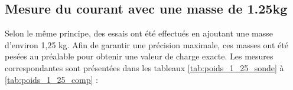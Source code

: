 \subsection{Mesure du courant avec une masse de 1.25kg}
Selon le même principe, des essais ont été effectués en ajoutant une masse d'environ 1,25 kg. Afin de garantir une précision maximale, ces masses ont été pesées au préalable pour obtenir une valeur de charge exacte. Les mesures correspondantes sont présentées dans les tableaux \ref{tab:poids_1_25_sonde} à \ref{tab:poids_1_25_comp} :

\begin{table}[H]
    \centering
\end{table}
